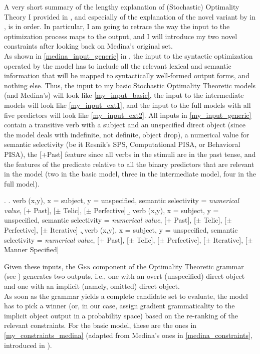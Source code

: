 A very short summary of the lengthy explanation of (Stochastic) Optimality Theory I provided in , and especially of the explanation of the novel variant by \textcite{Medina2007} in , is in order. In particular, I am going to retrace the way the input to the optimization process maps to the output, and I will introduce my two novel constraints after looking back on Medina's original set.\\
As shown in \ref{medina_input_generic} in , the input to the syntactic optimization operated by the model has to include all the relevant lexical and semantic information that will be mapped to syntactically well-formed output forms, and nothing else. Thus, the input to my basic Stochastic Optimality Theoretic models (and Medina's) will look like \ref{my_input_basic}, the input to the intermediate models will look like \ref{my_input_ext1}, and the input to the full models with all five predictors will look like \ref{my_input_ext2}. All inputs in \ref{my_input_generic} contain a transitive verb with a subject and an unspecified direct object (since the model deals with indefinite, not definite, object drop), a numerical value for semantic selectivity (be it Resnik's SPS, Computational PISA, or Behavioral PISA), the [+Past] feature since all verbs in the stimuli are in the past tense, and the features of the predicate relative to all the binary predictors that are relevant in the model (two in the basic model, three in the intermediate model, four in the full model).

\ex. \label{my_input_generic} 
\a. \label{my_input_basic} verb (x,y), x = subject, y = unspecified, semantic selectivity = \textit{numerical value}, [+ Past], [$\pm$ Telic], [$\pm$ Perfective]
\b. \label{my_input_ext1} verb (x,y), x = subject, y = unspecified, semantic selectivity = \textit{numerical value}, [+ Past], [$\pm$ Telic], [$\pm$ Perfective], [$\pm$ Iterative]
\c. \label{my_input_ext2} verb (x,y), x = subject, y = unspecified, semantic selectivity = \textit{numerical value}, [+ Past], [$\pm$ Telic], [$\pm$ Perfective], [$\pm$ Iterative], [$\pm$ Manner Specified]

Given these inputs, the \textsc{Gen} component of the Optimality Theoretic grammar (see ) generates two outputs, i.e., one with an overt (unspecified) direct object and one with an implicit (namely, omitted) direct object.\\
As soon as the grammar yields a complete candidate set to evaluate, the model has to pick a winner (or, in our case, assign gradient grammaticality to the implicit object output in a probability space) based on the re-ranking of the relevant constraints. For the basic model, these are the ones in \ref{my_constraints_medina} (adapted from Medina's ones in \ref{medina_constraints}, introduced in ).


